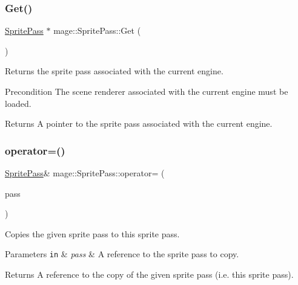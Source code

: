 \subsubsection{\texorpdfstring{Get()}{Get()}}
{\footnotesize\ttfamily \hyperlink{classmage_1_1_sprite_pass}{Sprite\+Pass} $\ast$ mage\+::\+Sprite\+Pass\+::\+Get (\begin{DoxyParamCaption}{ }\end{DoxyParamCaption})\hspace{0.3cm}{\ttfamily [static]}}

Returns the sprite pass associated with the current engine.

\begin{DoxyPrecond}{Precondition}
The scene renderer associated with the current engine must be loaded. 
\end{DoxyPrecond}
\begin{DoxyReturn}{Returns}
A pointer to the sprite pass associated with the current engine. 
\end{DoxyReturn}
\hypertarget{classmage_1_1_sprite_pass_af6e85ceefe88d588a1f19814fce4e44f}{}\label{classmage_1_1_sprite_pass_af6e85ceefe88d588a1f19814fce4e44f} 
\subsubsection{\texorpdfstring{operator=()}{operator=()}\hspace{0.1cm}{\footnotesize\ttfamily [1/2]}}
{\footnotesize\ttfamily \hyperlink{classmage_1_1_sprite_pass}{Sprite\+Pass}\& mage\+::\+Sprite\+Pass\+::operator= (\begin{DoxyParamCaption}\item[{const \hyperlink{classmage_1_1_sprite_pass}{Sprite\+Pass} \&}]{pass }\end{DoxyParamCaption})\hspace{0.3cm}{\ttfamily [delete]}}

Copies the given sprite pass to this sprite pass.


\begin{DoxyParams}[1]{Parameters}
\mbox{\tt in}  & {\em pass} & A reference to the sprite pass to copy. \\
\hline
\end{DoxyParams}
\begin{DoxyReturn}{Returns}
A reference to the copy of the given sprite pass (i.\+e. this sprite pass). 
\end{DoxyReturn}
\hypertarget{classmage_1_1_sprite_pass_ae5ae1381fd40a8d826e874ec08992060}{}\label{classmage_1_1_sprite_pass_ae5ae1381fd40a8d826e874ec08992060} 
